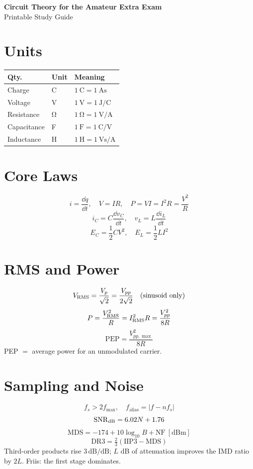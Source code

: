 \documentclass[10pt,letterpaper]{article}
\begin{document}
\begin{center}
{\Large\bfseries Circuit Theory for the Amateur Extra Exam}\\[0.2em]
{\normalsize Printable Study Guide}
\end{center}

\begin{multicols}{2}
\section*{Units}
\begin{tabularx}{\columnwidth}{@{}L{0.28\columnwidth}L{0.22\columnwidth}Y@{}}
\toprule
Qty. & Unit & Meaning\\
\midrule
Charge & \si{\coulomb} & \(\SI{1}{\coulomb}=\SI{1}{\ampere\second}\)\\
Voltage & \si{\volt} & \(\SI{1}{\volt}=\SI{1}{\joule\per\coulomb}\)\\
Resistance & \si{\ohm} & \(\SI{1}{\ohm}=\SI{1}{\volt\per\ampere}\)\\
Capacitance & \si{\farad} & \(\SI{1}{\farad}=\SI{1}{\coulomb\per\volt}\)\\
Inductance & \si{\henry} & \(\SI{1}{\henry}=\SI{1}{\volt\second\per\ampere}\)\\
\bottomrule
\end{tabularx}

\section*{Core Laws}
\[
i=\frac{\dd q}{\dd t},\quad V=IR,\quad
P=VI=I^2R=\frac{V^2}{R}
\]
\[
i_C=C\frac{\dd v_C}{\dd t},\quad
v_L=L\frac{\dd i_L}{\dd t}
\]
\[
E_C=\frac{1}{2}CV^2,\quad
E_L=\frac{1}{2}LI^2
\]

\section*{RMS and Power}
\[
V_{\mathrm{RMS}}=\frac{V_p}{\sqrt2}=\frac{V_{pp}}{2\sqrt2}
\quad\text{(sinusoid only)}
\]
\[
P=\frac{V_{\mathrm{RMS}}^2}{R}=I_{\mathrm{RMS}}^2R=\frac{V_{pp}^2}{8R}
\]
\[
\mathrm{PEP}=\frac{V_{pp,\max}^2}{8R}
\]
PEP \(=\) average power for an unmodulated carrier.

\section*{Sampling and Noise}
\[
f_s>2f_{\max},\quad
f_{\mathrm{alias}}=|f-nf_s|
\]
\[
\mathrm{SNR}_{\mathrm{dB}}=6.02N+1.76
\]
\[
\mathrm{MDS}=-174+10\log_{10}B+\mathrm{NF}\ [\mathrm{dBm}]
\]
\[
\mathrm{DR3}=\tfrac{2}{3}(\mathrm{IIP3}-\mathrm{MDS})
\]
Third-order products rise \(3\,\mathrm{dB/dB}\); \(L\) dB of attenuation improves
the IMD ratio by \(2L\). Friis: the first stage dominates.


\end{multicols}
\end{document}
